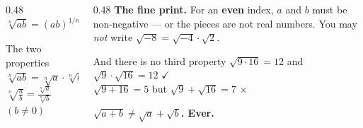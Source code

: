 \documentclass[aspectratio=169, 11pt]{beamer}
\begin{document}
\begin{frame}[t, plain]
  \begin{columns}[T]
    \begin{column}{0.48\textwidth}
      \[ \sqrt[n]{ab} = (ab)^{1/n} = a^{1/n}b^{1/n} = \sqrt[n]{a}\cdot\sqrt[n]{b} \]
      \vspace{-6pt}
      \begin{block}{The two properties}
        \centering
        $\displaystyle \sqrt[n]{ab}=\sqrt[n]{a}\cdot\sqrt[n]{b}$ \\[5pt]
        $\displaystyle \sqrt[n]{\frac{a}{b}}=\frac{\sqrt[n]{a}}{\sqrt[n]{b}}$ \quad $(b\ne0)$
      \end{block}
    \end{column}
    \begin{column}{0.48\textwidth}
      \footnotesize
      \textbf{The fine print.} For an \textbf{even} index, $a$ and $b$ must be non-negative --- or
      the pieces are not real numbers. You may \emph{not} write
      $\sqrt{-8}=\sqrt{-4}\cdot\sqrt{2}$.
      \vspace{6pt}
      \begin{block}{And there is no third property}
        $\sqrt{9\cdot16}=12$ \; and \; $\sqrt9\cdot\sqrt{16}=12$ \quad \textcolor{forest}{\textbf{$\checkmark$}} \\[3pt]
        $\sqrt{9+16}=5$ \; but \; $\sqrt9+\sqrt{16}=7$ \quad \textcolor{keyred}{$\times$}
      \end{block}
      \vspace{3pt}
      {\footnotesize \textcolor{goldacc}{\textbf{$\sqrt{a+b}\ne\sqrt a+\sqrt b$. Ever.}}}
    \end{column}
  \end{columns}
\end{frame}
\end{document}
